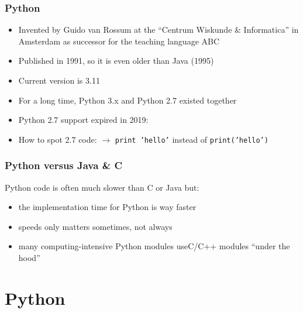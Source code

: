 \documentclass[english]{beamer}
\begin{document}
\begin{frame}

\tableofcontents

\end{frame}


\begin{frame}
\frametitle{Python}

\begin{itemize}
	\item Invented by Guido van Rossum at the \enquote{Centrum Wiskunde \& Informatica} in Amsterdam as successor for the teaching language ABC
	\item Published in 1991, so it is even older than Java (1995)
	\item Current version is 3.11
	\item For a long time, Python 3.x and Python 2.7 existed together
	\item Python 2.7 support expired in 2019:
	\item How to spot 2.7 code: $\rightarrow$ \texttt{print 'hello'} instead of \texttt{print('hello')}
\end{itemize}

\end{frame}

\begin{frame}
\frametitle{Python versus Java \& C}

Python code is often much slower than C or Java but: \vspace*{1em}

\begin{itemize}
\item the implementation time for Python is way faster
\item speeds only matters sometimes, not always
\item many computing-intensive Python modules use\newline C/C++ modules \enquote{under the hood}
\end{itemize}
\end{frame}

\section{Python}
\end{document}
